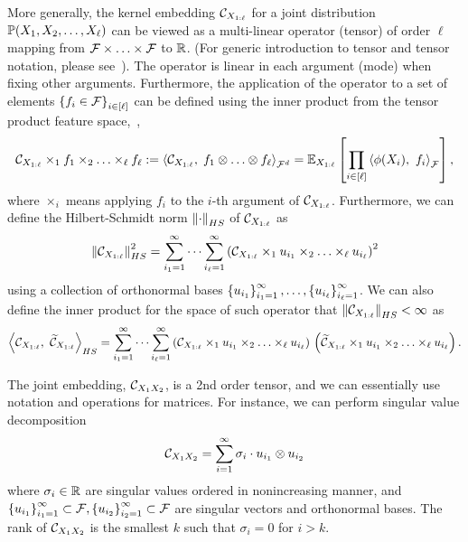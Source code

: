 \documentclass[11pt]{article}
\begin{document}
More generally, the kernel embedding $\mathcal{C}_{X_{1:\ell}}$ for a joint distribution $\mathbb{P}(X_1,X_2,\ldots,X_{\ell})$ can be viewed as a multi-linear operator (tensor) of order $\ell$ mapping from $\mathcal{F}\times\ldots\times \mathcal{F}$ to $\mathbb{R}$. (For generic introduction to tensor and tensor notation, please see~\cite{KolBad09}). The operator is linear in each argument (mode) when fixing other arguments. Furthermore, the application of the operator to a set of elements $\left\{f_i \in \mathcal{F}\right\}_{i \in [\ell]}$ can be defined using the inner product from the tensor product feature space,~\ie,
\begin{align}
	\mathcal{C}_{X_{1:\ell}} \times_1 f_1 \times_2 \ldots \times_\ell f_\ell := 	\left\langle \mathcal{C}_{X_{1:\ell}},\;f_1\otimes\ldots\otimes f_\ell \right\rangle_{\mathcal{F}^d}=\mathbb{E}_{X_{1:\ell}}\left[\prod_{i \in [\ell]} \left\langle \phi(X_i),~f_i \right\rangle_{\mathcal{F}}\right],
\end{align}
where $\times_i$ means applying $f_i$ to the $i$-th argument of $\mathcal{C}_{X_{1:\ell}}$. Furthermore, we can define the Hilbert-Schmidt norm $\left\|\cdot\right\|_{HS}$ of $\mathcal{C}_{X_{1:\ell}}$ as
\[
 \left\|\mathcal{C}_{X_{1:\ell}}\right\|_{HS}^2 = \sum_{i_1 = 1}^\infty \cdots \sum_{i_\ell = 1}^\infty \left(\mathcal{C}_{X_{1:\ell}} \times_1 u_{i_1} \times_2 \ldots \times_\ell u_{i_\ell}\right)^2
\]
using a collection of orthonormal bases $\left\{u_{i_1}\right\}_{i_1=1}^\infty, \ldots, \left\{u_{i_\ell}\right\}_{i_\ell=1}^\infty$. We can also define the inner product for the space of such operator that $\left\|\mathcal{C}_{X_{1:\ell}}\right\|_{HS}<\infty$ as
\begin{align}
	\left\langle \mathcal{C}_{X_{1:\ell}},~\widetilde{\mathcal{C}}_{X_{1:\ell}} \right\rangle_{HS}  =  \sum_{i_1 = 1}^\infty \cdots \sum_{i_\ell = 1}^\infty \left(\mathcal{C}_{X_{1:\ell}} \times_1 u_{i_1} \times_2 \ldots \times_\ell u_{i_\ell}\right)\, \left(\widetilde{\mathcal{C}}_{X_{1:\ell}} \times_1 u_{i_1} \times_2 \ldots \times_\ell u_{i_\ell}\right).
\end{align}


The joint embedding, $\mathcal{C}_{X_1 X_2}$, is a 2nd order tensor, and we can essentially use notation and operations for matrices. For instance, we can perform singular value decomposition
\[
    \mathcal{C}_{X_1X_2} = \sum_{i=1}^{\infty} \sigma_i \cdot u_{i_1} \otimes u_{i_2}
\]
where $\sigma_i \in \mathbb{R}$ are singular values ordered in nonincreasing manner, and $\left\{u_{i_1}\right\}_{i_1=1}^{\infty} \subset \mathcal{F}, \left\{u_{i_2}\right\}_{i_2=1}^{\infty} \subset \mathcal{F}$ are singular vectors and orthonormal bases. The rank of $\mathcal{C}_{X_1X_2}$ is the smallest $k$ such that $\sigma_i = 0$ for $i > k$.
\end{document}
